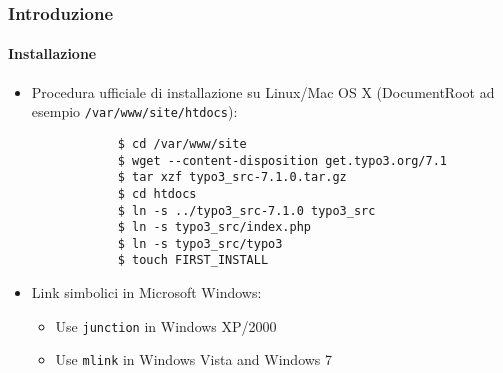 \begin{frame}[fragile]
	\frametitle{Introduzione}
	\framesubtitle{Installazione}

	\begin{itemize}
		\item Procedura ufficiale di installazione su Linux/Mac OS X\newline
			(DocumentRoot ad esempio \texttt{/var/www/site/htdocs}):
		\begin{lstlisting}
			$ cd /var/www/site
			$ wget --content-disposition get.typo3.org/7.1
			$ tar xzf typo3_src-7.1.0.tar.gz
			$ cd htdocs
			$ ln -s ../typo3_src-7.1.0 typo3_src
			$ ln -s typo3_src/index.php
			$ ln -s typo3_src/typo3
			$ touch FIRST_INSTALL
		\end{lstlisting}

		\item Link simbolici in Microsoft Windows:

			\begin{itemize}
				\item Use \texttt{junction} in Windows XP/2000
				\item Use \texttt{mlink} in Windows Vista and Windows 7
			\end{itemize}

	\end{itemize}
\end{frame}


